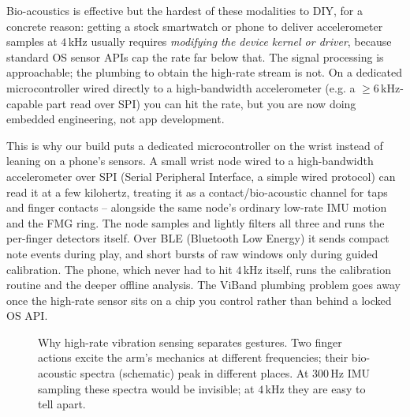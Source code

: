 \begin{trapbox}
Bio-acoustics is effective but the hardest of these modalities to DIY, for a concrete
reason: getting a stock smartwatch or phone to deliver accelerometer samples at
$4$\,kHz usually requires \emph{modifying the device kernel or driver}, because
standard OS sensor APIs cap the rate far below that. The signal processing is
approachable; the plumbing to obtain the high-rate stream is not. On a dedicated
microcontroller wired directly to a high-bandwidth accelerometer (e.g. a $\geq
6$\,kHz-capable part read over SPI) you can hit the rate, but you are now doing
embedded engineering, not app development.
\end{trapbox}

\begin{goalbox}
This is why our build puts a dedicated microcontroller on the wrist instead of leaning
on a phone's sensors. A small wrist node wired to a high-bandwidth accelerometer over
SPI (Serial Peripheral Interface, a simple wired protocol) can read it at a few kilohertz, treating it as a contact/bio-acoustic channel for
taps and finger contacts -- alongside the same node's ordinary low-rate IMU motion and
the FMG ring. The node samples and lightly filters all three and runs the per-finger
detectors itself. Over BLE (Bluetooth Low Energy) it sends compact note events during play, and short bursts of
raw windows only during guided calibration. The phone, which never had to hit
$4$\,kHz itself, runs the calibration routine and the deeper offline analysis. The ViBand plumbing problem goes away once the
high-rate sensor sits on a chip you control rather than behind a locked OS API.
\end{goalbox}

\begin{figure}[H]
\centering
{}
\caption{Why high-rate vibration sensing separates gestures. Two finger actions excite
the arm's mechanics at different frequencies; their bio-acoustic spectra (schematic)
peak in different places. At $300$\,Hz IMU sampling these spectra would be invisible;
at $4$\,kHz they are easy to tell apart.}
\label{ch37:fig-bioacoustic-spec}
\end{figure}

